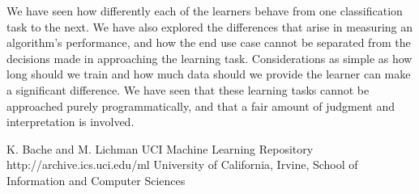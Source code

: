 \documentclass{sig-alternate}
\begin{document}
We have seen how differently each of the learners behave from one classification task to the next. We have also explored the differences that arise in measuring an algorithm's performance, and how the end use case cannot be separated from the decisions made in approaching the learning task. Considerations as simple as how long should we train and how much data should we provide the learner can make a significant difference. We have seen that these learning tasks cannot be approached purely programmatically, and that a fair amount of judgment and interpretation is involved.






\begin{thebibliography}{10}

K. Bache and M. Lichman
\newblock UCI Machine Learning Repository
\newblock http://archive.ics.uci.edu/ml
\newblock University of California, Irvine, School of Information and Computer Sciences


\end{thebibliography}
\end{document}
